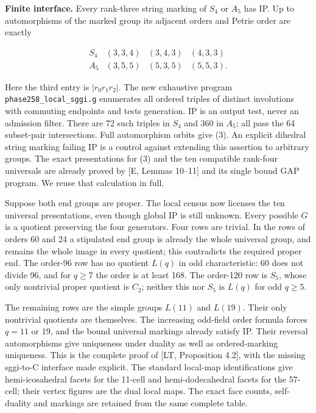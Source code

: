 \documentclass[
  11pt,
]{article}
\begin{document}
\textbf{Finite interface.} Every rank-three string marking of \(S_4\) or
\(A_5\) has IP. Up to automorphisms of the marked group its adjacent
orders and Petrie order are exactly

\[\begin{array}{c|ccc}
 S_4&(3,3,4)&(3,4,3)&(4,3,3)\\
 A_5&(3,5,5)&(5,3,5)&(5,5,3).
\end{array}\tag{3}\]

Here the third entry is \(|r_0r_1r_2|\). The new exhaustive program
\texttt{phase258\_local\_sggi.g} enumerates all ordered triples of
distinct involutions with commuting endpoints and tests generation. IP
is an output test, never an admission filter. There are 72 such triples
in \(S_4\) and 360 in \(A_5\); all pass the 64 subset-pair
intersections. Full automorphism orbits give (3). An explicit dihedral
string marking failing IP is a control against extending this assertion
to arbitrary groups. The exact presentations for (3) and the ten
compatible rank-four universals are already proved by {[}E, Lemmas
10--11{]} and its single bound GAP program. We reuse that calculation in
full.

Suppose both end groups are proper. The local census now licenses the
ten universal presentations, even though global IP is still unknown.
Every possible \(G\) is a quotient preserving the four generators. Four
rows are trivial. In the rows of orders 60 and 24 a stipulated end group
is already the whole universal group, and remains the whole image in
every quotient; this contradicts the required proper end. The order-96
row has no quotient \(L(q)\) in odd characteristic: \(60\) does not
divide 96, and for \(q\ge7\) the order is at least 168. The order-120
row is \(S_5\), whose only nontrivial proper quotient is \(C_2\);
neither this nor \(S_5\) is \(L(q)\) for odd \(q\ge5\).

The remaining rows are the simple groups \(L(11)\) and \(L(19)\). Their
only nontrivial quotients are themselves. The increasing odd-field order
formula forces \(q=11\) or \(19\), and the bound universal markings
already satisfy IP. Their reversal automorphisms give uniqueness under
duality as well as ordered-marking uniqueness. This is the complete
proof of {[}LT, Proposition 4.2{]}, with the missing sggi-to-C interface
made explicit. The standard local-map identifications give
hemi-icosahedral facets for the 11-cell and hemi-dodecahedral facets for
the 57-cell; their vertex figures are the dual local maps. The exact
face counts, self-duality and markings are retained from the same
complete table.
\end{document}
